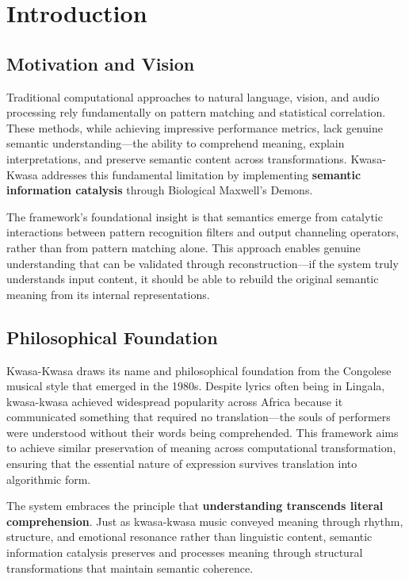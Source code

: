 \documentclass[12pt,a4paper,twoside]{article}
\begin{document}
\newpage
\tableofcontents
\newpage

\section{Introduction}

\subsection{Motivation and Vision}

Traditional computational approaches to natural language, vision, and audio processing rely fundamentally on pattern matching and statistical correlation. These methods, while achieving impressive performance metrics, lack genuine semantic understanding—the ability to comprehend meaning, explain interpretations, and preserve semantic content across transformations. Kwasa-Kwasa addresses this fundamental limitation by implementing \textbf{semantic information catalysis} through Biological Maxwell's Demons.

The framework's foundational insight is that semantics emerge from catalytic interactions between pattern recognition filters and output channeling operators, rather than from pattern matching alone. This approach enables genuine understanding that can be validated through reconstruction—if the system truly understands input content, it should be able to rebuild the original semantic meaning from its internal representations.

\subsection{Philosophical Foundation}

Kwasa-Kwasa draws its name and philosophical foundation from the Congolese musical style that emerged in the 1980s. Despite lyrics often being in Lingala, kwasa-kwasa achieved widespread popularity across Africa because it communicated something that required no translation—the souls of performers were understood without their words being comprehended. This framework aims to achieve similar preservation of meaning across computational transformation, ensuring that the essential nature of expression survives translation into algorithmic form.

The system embraces the principle that \textbf{understanding transcends literal comprehension}. Just as kwasa-kwasa music conveyed meaning through rhythm, structure, and emotional resonance rather than linguistic content, semantic information catalysis preserves and processes meaning through structural transformations that maintain semantic coherence.
\end{document}
